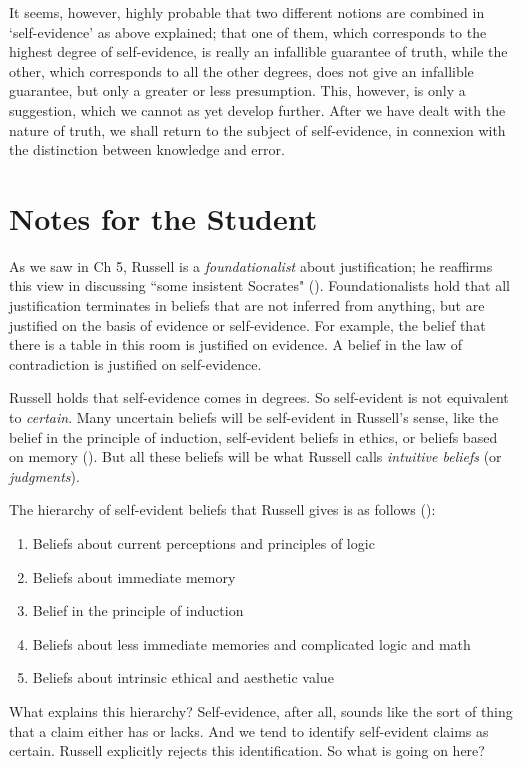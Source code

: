 \documentclass[oneside,letterpaper,12pt]{book}
\begin{document}
It seems, however, highly probable that two different notions are
combined in `self-evidence' as above
explained; that one of them, which corresponds to the highest degree of
self-evidence, is really an infallible guarantee of truth, while the
other, which corresponds to all the other degrees, does not give an
infallible guarantee, but only a greater or less presumption. This,
however, is only a suggestion, which we cannot as yet develop further.
After we have dealt with the nature of truth, we shall return to the
subject of self-evidence, in connexion with the distinction between
knowledge and error.

\protect\hypertarget{link2HCH0012}{}{}

\pagebreak
\section{Notes for the Student}
As we saw in Ch 5, Russell is a \textit{foundationalist} about justification; he reaffirms this view in discussing ``some insistent Socrates" (\pageref{socrates}). Foundationalists hold that all justification terminates in beliefs that are not inferred from anything, but are justified on the basis of evidence or self-evidence. For example, the belief that there is a table in this room is justified on evidence. A belief in the law of contradiction is justified on self-evidence.

Russell holds that self-evidence comes in degrees. So self-evident is not equivalent to \textit{certain}. Many uncertain beliefs will be self-evident in Russell's sense, like the belief in the principle of induction, self-evident beliefs in ethics, or beliefs based on memory (\pageref{uncertain}). But all these beliefs will be what Russell calls \textit{intuitive beliefs} (or \textit{judgments}).

The hierarchy of self-evident beliefs that Russell gives is as follows (\pageref{hierarchy}):
\begin{enumerate}
	\item Beliefs about current perceptions and principles of logic
	\item Beliefs about immediate memory
	\item Belief in the principle of induction
	\item Beliefs about less immediate memories and complicated logic and math
	\item Beliefs about intrinsic ethical and aesthetic value
\end{enumerate}
What explains this hierarchy? Self-evidence, after all, sounds like the sort of thing that a claim either has or lacks. And we tend to identify self-evident claims as certain. Russell explicitly rejects this identification. So what is going on here?
\end{document}
